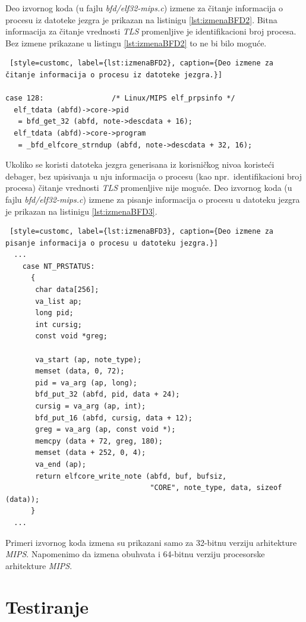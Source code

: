 \documentclass[12pt,oneside]{memoir}
\begin{document}
Deo izvornog koda (u fajlu \emph{bfd/elf32-mips.c}) izmene za čitanje informacija o procesu iz datoteke jezgra je prikazan na listinigu \ref{lst:izmenaBFD2}. Bitna informacija za čitanje vrednosti \emph{TLS} promenljive je identifikacioni broj procesa. Bez izmene prikazane u listingu \ref{lst:izmenaBFD2} to ne bi bilo moguće. \newpage
\begin{lstlisting} [style=customc, label={lst:izmenaBFD2}, caption={Deo izmene za čitanje informacija o procesu iz datoteke jezgra.}]

case 128:                /* Linux/MIPS elf_prpsinfo */
  elf_tdata (abfd)->core->pid
   = bfd_get_32 (abfd, note->descdata + 16);
  elf_tdata (abfd)->core->program
   = _bfd_elfcore_strndup (abfd, note->descdata + 32, 16);
\end{lstlisting}

Ukoliko se koristi datoteka jezgra generisana iz korisničkog nivoa koristeći debager, bez upisivanja u nju informacija o procesu (kao npr.~identifikacioni broj procesa) čitanje vrednosti \emph{TLS} promenljive nije moguće. Deo izvornog koda (u fajlu \emph{bfd/elf32-mips.c}) izmene za pisanje informacija o procesu u datoteku jezgra je prikazan na listinigu \ref{lst:izmenaBFD3}.
\begin{lstlisting} [style=customc, label={lst:izmenaBFD3}, caption={Deo izmene za pisanje informacija o procesu u datoteku jezgra.}]
  ...
    case NT_PRSTATUS:
      {
       char data[256];
       va_list ap;
       long pid;
       int cursig;
       const void *greg;

       va_start (ap, note_type);
       memset (data, 0, 72);
       pid = va_arg (ap, long);
       bfd_put_32 (abfd, pid, data + 24);
       cursig = va_arg (ap, int);
       bfd_put_16 (abfd, cursig, data + 12);
       greg = va_arg (ap, const void *);
       memcpy (data + 72, greg, 180);
       memset (data + 252, 0, 4);
       va_end (ap);
       return elfcore_write_note (abfd, buf, bufsiz,
                                  "CORE", note_type, data, sizeof (data));
      }
  ...
\end{lstlisting}

Primeri izvornog koda izmena su prikazani samo za 32-bitnu verziju arhitekture \emph{MIPS}. Napomenimo da izmena obuhvata i 64-bitnu verziju procesorske arhitekture \emph{MIPS}.

\section{Testiranje}
\end{document}

